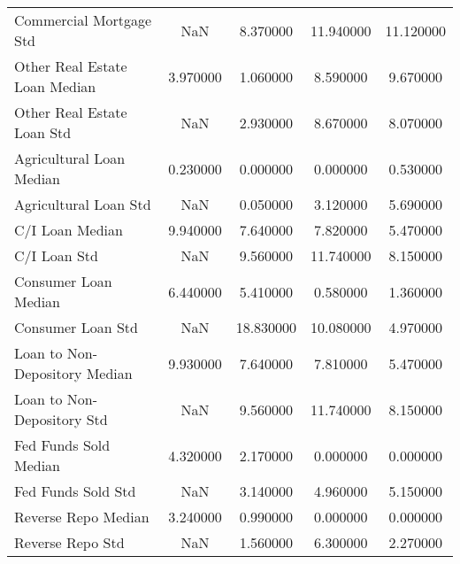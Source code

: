 \begin{table}
\begin{tabular}{lcccc}
Commercial Mortgage Std & NaN & 8.370000 & 11.940000 & 11.120000 \\
Other Real Estate Loan Median & 3.970000 & 1.060000 & 8.590000 & 9.670000 \\
Other Real Estate Loan Std & NaN & 2.930000 & 8.670000 & 8.070000 \\
Agricultural Loan Median & 0.230000 & 0.000000 & 0.000000 & 0.530000 \\
Agricultural Loan Std & NaN & 0.050000 & 3.120000 & 5.690000 \\
C/I Loan Median & 9.940000 & 7.640000 & 7.820000 & 5.470000 \\
C/I Loan Std & NaN & 9.560000 & 11.740000 & 8.150000 \\
Consumer Loan Median & 6.440000 & 5.410000 & 0.580000 & 1.360000 \\
Consumer Loan Std & NaN & 18.830000 & 10.080000 & 4.970000 \\
Loan to Non-Depository Median & 9.930000 & 7.640000 & 7.810000 & 5.470000 \\
Loan to Non-Depository Std & NaN & 9.560000 & 11.740000 & 8.150000 \\
Fed Funds Sold Median & 4.320000 & 2.170000 & 0.000000 & 0.000000 \\
Fed Funds Sold Std & NaN & 3.140000 & 4.960000 & 5.150000 \\
Reverse Repo Median & 3.240000 & 0.990000 & 0.000000 & 0.000000 \\
Reverse Repo Std & NaN & 1.560000 & 6.300000 & 2.270000 \\
\bottomrule
\end{tabular}
\end{table}
